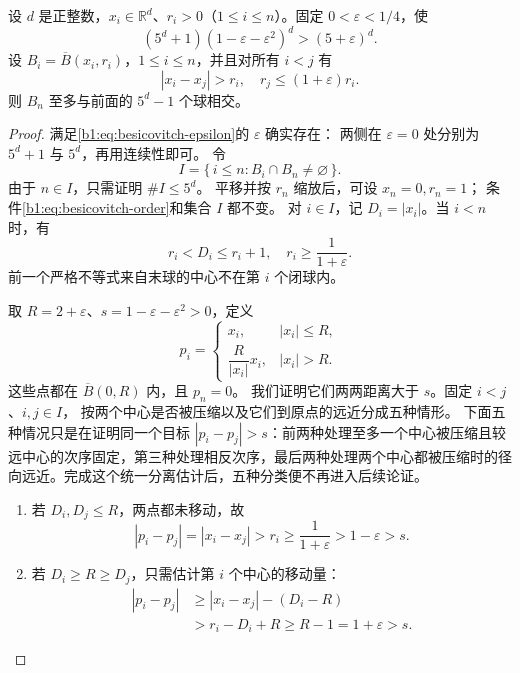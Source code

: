\begin{lemma}\label{b1:lem:besicovitch-geometric-bound}
设 \(d\) 是正整数，\(x_i\in\mathbb R^d\)、\(r_i>0\)（\(1\le i\le n\)）。固定 \(0<\varepsilon<1/4\)，使
\begin{equation}\label{b1:eq:besicovitch-epsilon}
 (5^d+1)(1-\varepsilon-\varepsilon^2)^d>(5+\varepsilon)^d.
\end{equation}
设 \(B_i=\overline B(x_i,r_i)\)，\(1\leq i\leq n\)，并且对所有 \(i<j\) 有
\begin{equation}\label{b1:eq:besicovitch-order}
 |x_i-x_j|>r_i,\quad r_j\leq(1+\varepsilon)r_i.
\end{equation}
则 \(B_n\) 至多与前面的 \(5^d-1\) 个球相交。
\end{lemma}
\begin{proof}
满足\eqref{b1:eq:besicovitch-epsilon}的 \(\varepsilon\) 确实存在：
两侧在 \(\varepsilon=0\) 处分别为 \(5^d+1\) 与 \(5^d\)，再用连续性即可。
令
\[
 I=\{\,i\leq n:B_i\cap B_n\ne\varnothing\,\}.
\]
由于 \(n\in I\)，只需证明 \(\#I\leq5^d\)。
平移并按 \(r_n\) 缩放后，可设 \(x_n=0,r_n=1\)；
条件\eqref{b1:eq:besicovitch-order}和集合 \(I\) 都不变。
对 \(i\in I\)，记 \(D_i=|x_i|\)。当 \(i<n\) 时，有
\[
 r_i<D_i\leq r_i+1,\quad r_i\geq\frac1{1+\varepsilon}.
\]
前一个严格不等式来自末球的中心不在第 \(i\) 个闭球内。

取 \(R=2+\varepsilon\)、\(s=1-\varepsilon-\varepsilon^2>0\)，定义
\[
 p_i=
 \begin{cases}
 x_i,& |x_i|\leq R,\\[2pt]
 \dfrac R{|x_i|}x_i,& |x_i|>R.
 \end{cases}
\]
这些点都在 \(\overline B(0,R)\) 内，且 \(p_n=0\)。
我们证明它们两两距离大于 \(s\)。固定 \(i<j\)、\(i,j\in I\)，
按两个中心是否被压缩以及它们到原点的远近分成五种情形。
下面五种情况只是在证明同一个目标 \(|p_i-p_j|>s\)：前两种处理至多一个中心被压缩且较远中心的次序固定，第三种处理相反次序，最后两种处理两个中心都被压缩时的径向远近。完成这个统一分离估计后，五种分类便不再进入后续论证。

\begin{enumerate}
\item\label{b1:item:besicovitch-case-one}
若 \(D_i,D_j\leq R\)，两点都未移动，故
\[
 |p_i-p_j|=|x_i-x_j|>r_i
 \geq\frac1{1+\varepsilon}>1-\varepsilon>s.
\]

\item\label{b1:item:besicovitch-case-two}
若 \(D_i\geq R\geq D_j\)，只需估计第 \(i\) 个中心的移动量：
\[
 \begin{aligned}
 |p_i-p_j|
 &\geq |x_i-x_j|-(D_i-R)\\
 &>r_i-D_i+R
 \geq R-1=1+\varepsilon>s.
 \end{aligned}
\]


\end{enumerate}
\end{proof}
